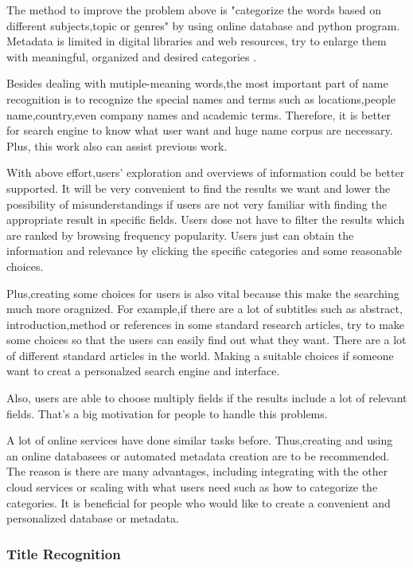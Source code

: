 The method to improve the problem above is "categorize the words based on different subjects,topic or genres" by using online database and python program.
Metadata is limited in digital libraries and web resources, try to enlarge them with meaningful, organized and desired
categories \cite{Kules2006}.

Besides dealing with mutiple-meaning words,the most important part of name recognition is to recognize the special names and terms such as locations,people name,country,even company names and academic terms.
Therefore, it is better for search engine to know what user want and huge name corpus are necessary. Plus, this work also can assist previous work.

With above effort,users' exploration and overviews of information could be better supported. 
It will be very convenient to find the results we want and lower the possibility of misunderstandings if users are not 
very familiar with finding the appropriate result in specific fields.\cite{TunThuraThet2010} 
Users dose not have to filter the results which are ranked by browsing frequency popularity. 
Users just can obtain the information and relevance by clicking the specific categories and some reasonable choices.

Plus,creating some choices for users is also vital because this make the searching much more oragnized.
For example,if there are a lot of subtitles such as abstract, introduction,method or references in some standard research 
articles, try to make some choices so that the users can easily find out what they want.
There are a lot of different standard articles in the world.
Making a suitable choices if someone want to creat a personalzed search engine and interface. 
     
Also, users are able to choose multiply fields if the results include a lot of relevant fields. 
That's a big motivation for people to handle this problems. 

A lot of online services have done similar tasks before.
Thus,creating and using an online databasees or automated metadata creation are to be recommended.
The reason is there are many advantages, including integrating with the other cloud services or scaling with what users 
need such as how to categorize the categories.
It is beneficial for people who would like to create a convenient and personalized database or metadata.\\



\subsubsection*{Title Recognition}

